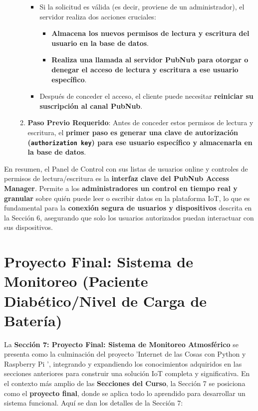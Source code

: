\documentclass{report}
\begin{document}
\begin{itemize}
\begin{enumerate}
\begin{itemize}
            \item Si la solicitud es válida (es decir, proviene de un administrador), el servidor realiza dos acciones cruciales:
            \begin{itemize}
                \item \textbf{Almacena los nuevos permisos de lectura y escritura del usuario en la base de datos}.
                \item \textbf{Realiza una llamada al servidor PubNub para otorgar o denegar el acceso de lectura y escritura a ese usuario específico}.
            \end{itemize}
            \item Después de conceder el acceso, el cliente puede necesitar \textbf{reiniciar su suscripción al canal PubNub}.
        \end{itemize}
    \item \textbf{Paso Previo Requerido}: Antes de conceder estos permisos de lectura y escritura, el \textbf{primer paso es generar una clave de 
    autorización (\texttt{authorization key}) para ese usuario específico y almacenarla en la base de datos}.
    \end{enumerate}
\end{itemize}
En resumen, el Panel de Control con sus listas de usuarios online y controles de permisos de lectura/escritura es la \textbf{interfaz clave del PubNub 
Access Manager}. Permite a los \textbf{administradores un control en tiempo real y granular} sobre quién puede leer o escribir datos en la plataforma 
IoT, lo que es fundamental para la \textbf{conexión segura de usuarios y dispositivos} descrita en la Sección 6, asegurando que solo los usuarios 
autorizados puedan interactuar con sus dispositivos.

\section{Proyecto Final: Sistema de Monitoreo (Paciente Diabético/Nivel de Carga de Batería)}
La \textbf{Sección 7: Proyecto Final: Sistema de Monitoreo Atmosférico} se presenta como la culminación del proyecto  'Internet de las Cosas con Python 
y Raspberry Pi ', integrando y expandiendo los conocimientos adquiridos en las secciones anteriores para construir una solución IoT completa y 
significativa. En el contexto más amplio de las \textbf{Secciones del Curso}, la Sección 7 se posiciona como el \textbf{proyecto final}, donde se 
aplica todo lo aprendido para desarrollar un sistema funcional. Aquí se dan los detalles de la Sección 7:
\end{document}
